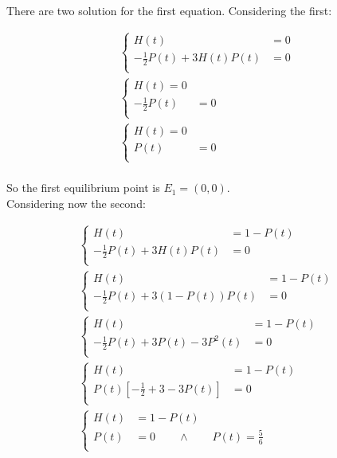   There are two solution for the first equation.
  Considering the first:

  \begin{align*}
    \begin{cases}
      H(t) &= 0\\
      -\frac{1}{2} P(t) + 3H(t)P(t) &= 0\\
    \end{cases}\\
    \begin{cases}
      H(t) = 0\\
      -\frac{1}{2} P(t)&= 0\\
    \end{cases}\\
    \begin{cases}
      H(t) = 0\\
      P(t)&= 0\\
    \end{cases}\\
  \end{align*}

  So the first equilibrium point is $E_1 = (0,0)$.\\
  Considering now the second:

  \begin{align*}
    \begin{cases}
      H(t) &= 1-P(t)\\
      -\frac{1}{2} P(t) + 3H(t)P(t) &= 0\\
    \end{cases}\\
    \begin{cases}
      H(t) &= 1-P(t)\\
      -\frac{1}{2} P(t) + 3(1-P(t))P(t) &= 0\\
    \end{cases}\\
    \begin{cases}
      H(t) &= 1-P(t)\\
      -\frac{1}{2} P(t) + 3P(t) - 3P^2(t) &= 0\\
    \end{cases}\\
    \begin{cases}
      H(t) &= 1-P(t)\\
      P(t)\left[-\frac{1}{2} + 3 - 3P(t)\right] &= 0\\
    \end{cases}\\
    \begin{cases}
      H(t) &= 1-P(t)\\
      P(t) &= 0\qquad\land\qquad P(t) = \frac{5}{6}\\
    \end{cases}\\
  \end{align*}

